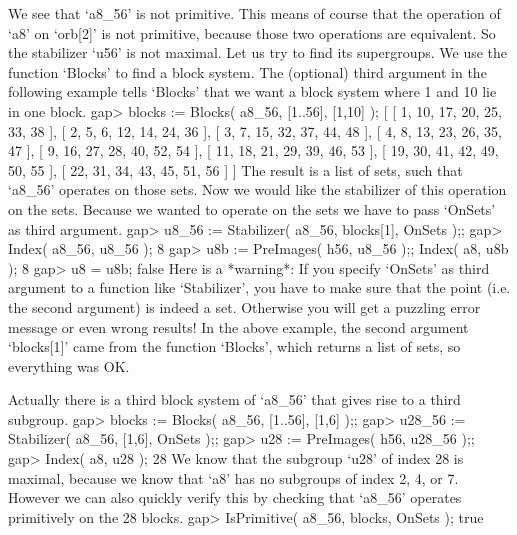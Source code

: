 We see that `a8\_56' is  not  primitive.  This means of course  that  the
operation of  `a8'  on  `orb[2]'  is  not  primitive,  because  those two
operations are equivalent.   So the stabilizer `u56' is not maximal.  Let
us  try to find its supergroups.  We use the  function `Blocks' to find a
block  system.   The (optional) third argument  in the following  example
tells `Blocks' that we  want a  block  system where  1 and 10 lie in  one
block.
\beginexample
    gap> blocks := Blocks( a8_56, [1..56], [1,10] );
    [ [ 1, 10, 17, 20, 25, 33, 38 ], [ 2, 5, 6, 12, 14, 24, 36 ], 
      [ 3, 7, 15, 32, 37, 44, 48 ], [ 4, 8, 13, 23, 26, 35, 47 ], 
      [ 9, 16, 27, 28, 40, 52, 54 ], [ 11, 18, 21, 29, 39, 46, 53 ], 
      [ 19, 30, 41, 42, 49, 50, 55 ], [ 22, 31, 34, 43, 45, 51, 56 ] ]
\endexample
The result is a list of sets, such that  `a8\_56' operates on those sets.
Now we would like the  stabilizer of this  operation on the sets. Because
we  wanted to operate   on the sets we  have  to pass  `OnSets' as  third
argument.
\beginexample
    gap> u8_56 := Stabilizer( a8_56, blocks[1], OnSets );;
    gap> Index( a8_56, u8_56 );
    8
    gap> u8b := PreImages( h56, u8_56 );; Index( a8, u8b );
    8
    gap> u8 = u8b;
    false
\endexample
Here  is a *warning*:   If you specify `OnSets'  as  third argument  to a
function like  `Stabilizer', you have to  make sure that the  point (i.e.
the second argument) is  indeed a set. Otherwise you  will get a puzzling
error message or  even  wrong results! In  the above  example, the second
argument  `blocks[1]'  came from the  function  `Blocks', which returns a
list of sets, so everything was OK.

Actually there  is a  third block system of `a8\_56' that gives rise to a
third subgroup.
\beginexample
    gap> blocks := Blocks( a8_56, [1..56], [1,6] );;
    gap> u28_56 := Stabilizer( a8_56, [1,6], OnSets );;
    gap> u28 := PreImages( h56, u28_56 );;
    gap> Index( a8, u28 );
    28 
\endexample
We know that the subgroup `u28' of  index 28 is  maximal, because we know
that `a8' has  no subgroups of  index 2,  4, or  7.  However  we can also
quickly verify this by checking that `a8\_56' operates primitively on the
28 blocks.
\beginexample
    gap> IsPrimitive( a8_56, blocks, OnSets );
    true 
\endexample

